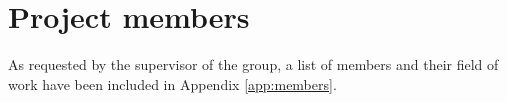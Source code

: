 \section{Project members}
As requested by the supervisor of the group, a list of members and their field of work have been included in Appendix \ref{app:members}.
